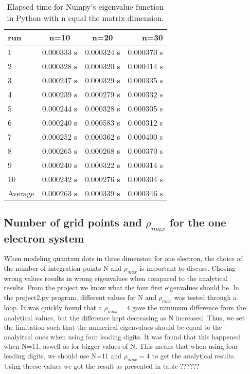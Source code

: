 \documentclass{article}
\begin{document}
\begin{table}[H]
    \centering
    \begin{tabular}{|l|c|c|r|}
    \hline
     run & n=10 & n=20 & n=30 \\
     \hline
      1  & 0.000333 s & 0.000324 s & 0.000370 s\\
      2  & 0.000328 s & 0.000320 s & 0.000414 s\\
      3  & 0.000247 s & 0.000329 s & 0.000335 s\\
      4  & 0.000239 s & 0.000279 s & 0.000332 s\\
      5  & 0.000244 s & 0.000328 s & 0.000305 s\\
      6  & 0.000240 s & 0.000583 s & 0.000312 s\\
      7  & 0.000252 s & 0.000362 s & 0.000400 s\\
      8  & 0.000265 s & 0.000268 s & 0.000370 s\\
      9  & 0.000240 s & 0.000322 s & 0.000314 s\\
      10 & 0.000242 s & 0.000276 s & 0.000304 s\\
      \hline
      Average & 0.000263 s & 0.000339 s & 0.000346 s\\
      \hline
    \end{tabular}
    \caption{Elapsed time for Numpy's eigenvalue function in Python with n equal the matrix dimension.}
    \label{timeusednumpy}
\end{table}








\subsection{Number of grid points and $\rho_{max}$ for the one electron system}

When modeling quantum dots in three dimension for one electron, the choice of the number of integration points N and $\rho_{max}$ is important to discuss. Chosing wrong values results in wrong eigenvalues when compared to the analytical results. From the project we know what the four first eigenvalues should be. In the project2.py program, different values for N and $\rho_{max}$ was tested through a loop.
It was quickly found that a $\rho_{max}=4$ gave the minimum difference from the analytical values, but the difference kept decreasing as N increased. Thus, we set the limitation such that the numerical eigenvalues should be equal to the analyitcal ones when using four leading digits. It was found that this happened when N=11, aswell as for bigger values of N. This means that when using four leading digits, we should use N=11 and $\rho_{max}=4$ to get the analytical results. Using theese values we got the result as presented in table ??????
\end{document}
